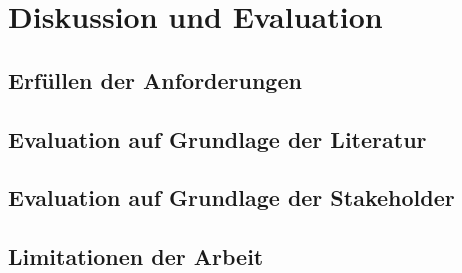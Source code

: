 \chapter{Diskussion und Evaluation} %
\label{sec:discussion}


\section{Erfüllen der Anforderungen}
\label{sec:requirements_evaluation}

\section{Evaluation auf Grundlage der Literatur}
\label{sec:evaluationliteratur}

\section{Evaluation auf Grundlage der Stakeholder}
\label{sec:evaluationstakeholder}

\section{Limitationen der Arbeit}
\label{sec:limitations}